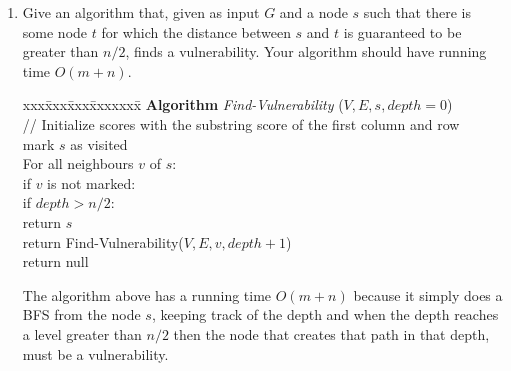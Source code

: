 \documentclass[11pt]{article}
\def\ans#1{{\color{ans}#1}}
\begin{document}
\begin{enumerate}
\item Give an algorithm that, given as input $G$ and a node $s$ such that
there is some node $t$ for which the distance between $s$ and $t$
is guaranteed to be greater than $n/2$, finds a vulnerability. Your
algorithm should have running time $O(m + n)$. 
\begin{tabbing}
  xxx\=xxx\=xxx\=xxxxxxx\= \kill \color{ans}
  {\bf Algorithm} {\em Find-Vulnerability} ($V,E,s, depth=0$)\\ [0pt \color{ans}]
  \> // Initialize scores with the substring score of the first column and row \\
  \> mark $s$ as visited \\
  \> For all neighbours $v$ of $s$: \\
  \>\> if $v$ is not marked: \\
  \>\>\> if $depth > n/2$: \\
  \>\>\>\> return $s$ \\
  \>\>\> return Find-Vulnerability($V,E,v,depth+1$) \\
  \> return null
\end{tabbing}
\ans{
  The algorithm above has a running time $O(m+n)$ because it simply does a BFS from the node 
  $s$, keeping track of the depth and when the depth reaches a level greater than $n/2$ 
  then the node that creates that path in that depth, must be a vulnerability. 
}
\end{enumerate}
\end{document}
